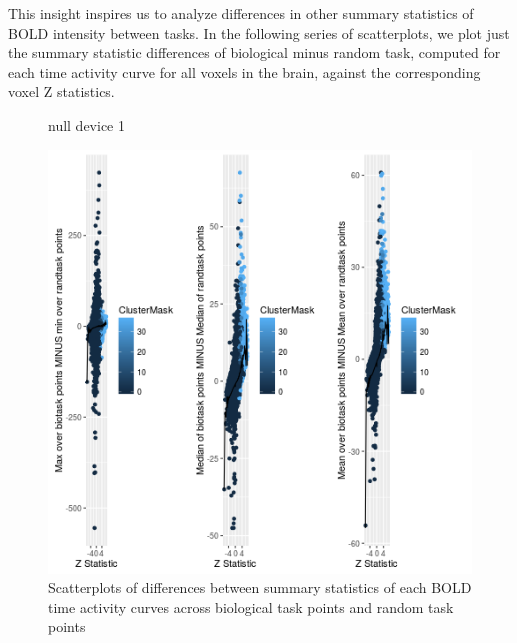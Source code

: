 \documentclass{report}
\begin{document}
This insight inspires us to analyze differences in other summary statistics of BOLD intensity between tasks. In the following series of scatterplots, we plot just the summary statistic differences of biological minus random task, computed for each time activity curve for all voxels in the brain, against the corresponding voxel Z statistics. 

\begin{figure}

\caption{Scatterplots of differences between summary statistics of each BOLD time activity curves across biological task points and random task points}
\label{fig:figure3}
\begin{Schunk}
\begin{Soutput}
null device 
          1 
\end{Soutput}
\end{Schunk}
\includegraphics[width=\textwidth,keepaspectratio]{fig3}
\end{figure}
\end{document}
